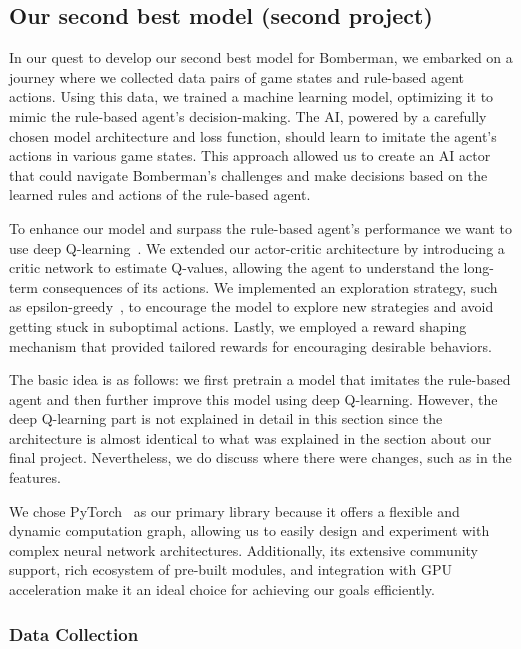 \newpage
{}

\subsection{Our second best model (second project)}

In our quest to develop our second best model for Bomberman, we embarked on a journey where we collected data pairs of game 
states and rule-based agent actions. Using this data, we trained a machine learning model, optimizing it to mimic 
the rule-based agent's decision-making. The AI, powered by a carefully chosen model architecture and loss function, 
should learn to imitate the agent's actions in various game states. This approach allowed us to create an AI actor 
that could navigate Bomberman's challenges and make decisions based on the learned rules and actions of the rule-based agent.

To enhance our model and surpass the rule-based agent's performance we want to use deep Q-learning~\cite{Art:torchQlearn}. We extended our actor-critic architecture by 
introducing a critic network to estimate Q-values, allowing the agent to understand the long-term consequences of its actions. 
We implemented an exploration strategy, such as epsilon-greedy~\cite{Onl:greedy}, to encourage the model to explore new strategies and avoid getting 
stuck in suboptimal actions. Lastly, we employed a reward shaping mechanism that provided tailored rewards for encouraging desirable behaviors.

The basic idea is as follows: we first pretrain a model that imitates the rule-based agent and then further improve this model using deep Q-learning. 
However, the deep Q-learning part is not explained in detail in this section since the architecture is almost identical to what was explained in the 
section about our final project. Nevertheless, we do discuss where there were changes, such as in the features.

We chose PyTorch~\cite{Onl:pytorch} as our primary library because it offers a flexible and dynamic computation graph, allowing us to easily design and 
experiment with complex neural network architectures. Additionally, its extensive community support, rich ecosystem of pre-built modules, 
and integration with GPU acceleration make it an ideal choice for achieving our goals efficiently.

\subsubsection*{Data Collection}


